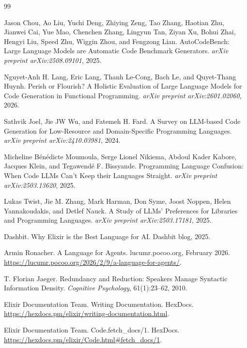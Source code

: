\documentclass[11pt]{article}
\begin{document}
\clearpage
\begin{thebibliography}{99}

Jason Chou, Ao Liu, Yuchi Deng, Zhiying Zeng, Tao Zhang, Haotian Zhu, Jianwei Cai, Yue Mao, Chenchen Zhang, Lingyun Tan, Ziyan Xu, Bohui Zhai, Hengyi Liu, Speed Zhu, Wiggin Zhou, and Fengzong Lian.
\newblock AutoCodeBench: Large Language Models are Automatic Code Benchmark Generators.
\newblock \emph{arXiv preprint arXiv:2508.09101}, 2025.

Nguyet-Anh H. Lang, Eric Lang, Thanh Le-Cong, Bach Le, and Quyet-Thang Huynh.
\newblock Perish or Flourish? A Holistic Evaluation of Large Language Models for Code Generation in Functional Programming.
\newblock \emph{arXiv preprint arXiv:2601.02060}, 2026.

Sathvik Joel, Jie JW Wu, and Fatemeh H. Fard.
\newblock A Survey on LLM-based Code Generation for Low-Resource and Domain-Specific Programming Languages.
\newblock \emph{arXiv preprint arXiv:2410.03981}, 2024.

Micheline B\'en\'edicte Moumoula, Serge Lionel Nikiema, Abdoul Kader Kabore, Jacques Klein, and Tegawend\'e F. Bissyande.
\newblock Programming Language Confusion: When Code LLMs Can't Keep their Languages Straight.
\newblock \emph{arXiv preprint arXiv:2503.13620}, 2025.

Lukas Twist, Jie M. Zhang, Mark Harman, Don Syme, Joost Noppen, Helen Yannakoudakis, and Detlef Nauck.
\newblock A Study of LLMs' Preferences for Libraries and Programming Languages.
\newblock \emph{arXiv preprint arXiv:2503.17181}, 2025.

Dashbit.
\newblock Why Elixir is the Best Language for AI.
\newblock Dashbit blog, 2025.

Armin Ronacher.
\newblock A Language for Agents.
\newblock lucumr.pocoo.org, February 2026.
\newblock \url{https://lucumr.pocoo.org/2026/2/9/a-language-for-agents/}.

T. Florian Jaeger.
\newblock Redundancy and Reduction: Speakers Manage Syntactic Information Density.
\newblock \emph{Cognitive Psychology}, 61(1):23--62, 2010.

Elixir Documentation Team.
\newblock Writing Documentation.
\newblock HexDocs.
\newblock \url{https://hexdocs.pm/elixir/writing-documentation.html}.

Elixir Documentation Team.
\newblock Code.fetch\_docs/1.
\newblock HexDocs.
\newblock \url{https://hexdocs.pm/elixir/Code.html#fetch_docs/1}.


\end{thebibliography}
\end{document}

